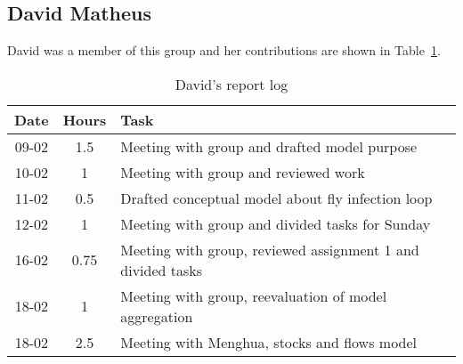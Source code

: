 \subsection{David Matheus}
David was a member of this group and her contributions are shown in Table~\ref{tab:david_log}. 
\begin{longtable}[c]{c|c|m{35em}}
\caption{David's report log}
\label{tab:david_log}\\
\textbf{Date}& \textbf{Hours} & \textbf{Task} \\
\hline
\endfirsthead
%
\endhead
%
09-02   &   1.5     &   Meeting with group and drafted model purpose                    \\
10-02   &   1       &   Meeting with group and reviewed work                            \\
11-02   &   0.5     &   Drafted conceptual model about fly infection loop               \\
12-02   &   1       &   Meeting with group and divided tasks for Sunday                 \\
16-02   &   0.75    &   Meeting with group, reviewed assignment 1 and divided tasks     \\
18-02   &   1       &   Meeting with group, reevaluation of model aggregation           \\
18-02   &   2.5     &   Meeting with Menghua, stocks and flows model                     \\
\end{longtable}